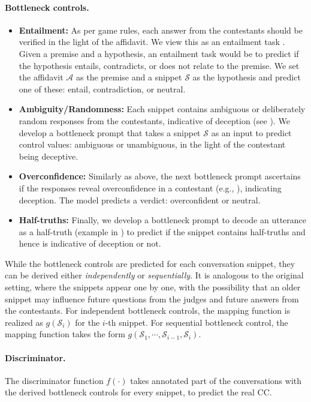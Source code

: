 \paragraph{Bottleneck controls.}
\begin{itemize}
    \item \textbf{Entailment:} As per game rules, each answer from the contestants should be verified in the light of the affidavit. We view this as an entailment task \cite{Tafjord2022EntailerAQ}. Given a premise and a hypothesis, an entailment task would be to predict if the hypothesis entails, contradicts, or does not relate to the premise. We set the affidavit $\mathcal{A}$ as the premise and a snippet $\mathcal{S}$ as the hypothesis and predict one of these: entail, contradiction, or neutral.
    \item \textbf{Ambiguity/Randomness:} Each snippet contains ambiguous or deliberately random responses from the contestants, indicative of deception (see ). We develop a bottleneck prompt that takes a snippet $\mathcal{S}$ as an input to predict control values: ambiguous or unambiguous, in the light of the contestant being deceptive.  
    \item \textbf{Overconfidence:} Similarly as above, the next bottleneck prompt ascertains if the responses reveal overconfidence in a contestant (e.g., ), indicating deception. The model predicts a verdict: overconfident or neutral.
    \item \textbf{Half-truths:} Finally, we develop a bottleneck prompt to decode an utterance as a half-truth (example in ) to predict if the snippet contains half-truths and hence is indicative of deception or not.    
\end{itemize}

While the bottleneck controls are predicted for each conversation snippet, they can be derived either \emph{independently} or \emph{sequentially}. It is analogous to the original setting, where the snippets appear one by one, with the possibility that an older snippet may influence future questions from the judges and future answers from the contestants. For independent bottleneck controls, the mapping function is realized as $g(\mathcal{S}_i)$ for the $i$-th snippet. For sequential bottleneck control, the mapping function takes the form $g(\mathcal{S}_1,\cdots,\mathcal{S}_{i-1}, \mathcal{S}_i)$.

\paragraph{Discriminator.} The discriminator function $f({\cdot})$ takes annotated part of the conversations with the derived bottleneck controls for every snippet, to predict the real CC.

